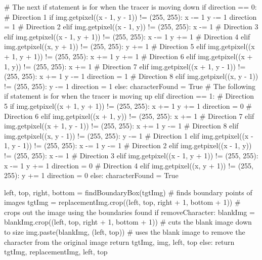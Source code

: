 \documentclass{report}
\begin{document}
\begin{python}
        #  The next if statement is for when the tracer is moving down
        if direction == 0:
            # Direction 1
            if img.getpixel((x - 1, y - 1)) != (255, 255):
                x -= 1
                y -= 1
                direction = 1
            # Direction 2
            elif img.getpixel((x - 1, y)) != (255, 255):
                x -= 1
            # Direction 3
            elif img.getpixel((x - 1, y + 1)) != (255, 255):
                x -= 1
                y += 1
            # Direction 4
            elif img.getpixel((x, y + 1)) != (255, 255):
                y += 1
            # Direction 5
            elif img.getpixel((x + 1, y + 1)) != (255, 255):
                x += 1
                y += 1
            # Direction 6
            elif img.getpixel((x + 1, y)) != (255, 255):
                x += 1
            # Direction 7
            elif img.getpixel((x + 1, y - 1)) != (255, 255):
                x += 1
                y -= 1
                direction = 1
            # Direction 8
            elif img.getpixel((x, y - 1)) != (255, 255):
                y -= 1
                direction = 1
            else:
                characterFound = True
        #  The following if statement is for when the tracer is moving up
        elif direction == 1:
            # Direction 5
            if img.getpixel((x + 1, y + 1)) != (255, 255):
                x += 1
                y += 1
                direction = 0
            # Direction 6
            elif img.getpixel((x + 1, y)) != (255, 255):
                x += 1
            # Direction 7
            elif img.getpixel((x + 1, y - 1)) != (255, 255):
                x += 1
                y -= 1
            # Direction 8
            elif img.getpixel((x, y - 1)) != (255, 255):
                y -= 1
            # Direction 1
            elif img.getpixel((x - 1, y - 1)) != (255, 255):
                x -= 1
                y -= 1
            # Direction 2
            elif img.getpixel((x - 1, y)) != (255, 255):
                x -= 1
            # Direction 3
            elif img.getpixel((x - 1, y + 1)) != (255, 255):
                x -= 1
                y += 1
                direction = 0
            # Direction 4
            elif img.getpixel((x, y + 1)) != (255, 255):
                y += 1
                direction = 0
            else:
                characterFound = True

    left, top, right, bottom = findBoundaryBox(tgtImg)  # finds boundary points of images
    tgtImg = replacementImg.crop((left, top, right + 1, bottom + 1))  # crops out the image using the boundaries found
    if removeCharacter:
        blankImg = blankImg.crop((left, top, right + 1, bottom + 1))  # cuts the blank image down to size
        img.paste(blankImg, (left, top))  # uses the blank image to remove the character from the original image
        return tgtImg, img, left, top
    else:
        return tgtImg, replacementImg, left, top



\end{python}
\end{document}

